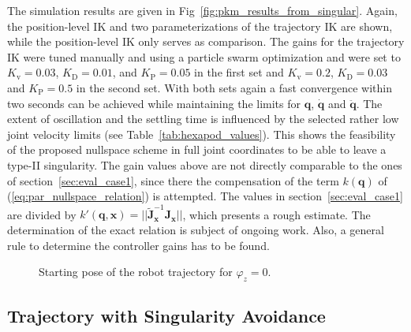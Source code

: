 \documentclass[a4paper,twoside]{article}
\begin{document}
The simulation results are given in Fig~\ref{fig:pkm_results_from_singular}.
Again, the position-level IK and two parameterizations of the trajectory IK are shown, while the position-level IK only serves as comparison.
The gains for the trajectory IK were tuned manually and using a particle swarm optimization and were set to $K_\mathrm{v}{=}0.03$, $K_\mathrm{D}{=}0.01$, and $K_\mathrm{P}{=}0.05$ in the first set and $K_\mathrm{v}{=}0.2$, $K_\mathrm{D}{=}0.03$ and $K_\mathrm{P}{=}0.5$ in the second set.
With both sets again a fast convergence within two seconds can be achieved while maintaining the limits for $\bm{q}$, $\dot{\bm{q}}$ and $\ddot{\bm{q}}$.
The extent of oscillation and the settling time is influenced by the selected rather low joint velocity limits (see Table~\ref{tab:hexapod_values}).
This shows the feasibility of the proposed nullspace scheme in full joint coordinates to be able to leave a type-II singularity.
%
The gain values above are not directly comparable to the ones of section~\ref{sec:eval_case1}, since there the compensation of the term $k(\bm{q})$ of (\ref{eq:par_nullspace_relation}) is attempted.
The values in section~\ref{sec:eval_case1} are divided by $k'(\bm{q},\bm{x})=||\tilde{\bm{J}}^{-1}_{\bm{x}} \bm{J}_{\bm{x}}||$, which presents a rough estimate.
The determination of the exact relation is subject of ongoing work.
Also, a general rule to determine the controller gains has to be found.


\begin{figure}[b]
	
	\caption{Starting pose of the robot trajectory for $\varphi_z{=}0$.}
	\label{fig:pkm_trajectory_startpose}
\end{figure}

\subsection{Trajectory with Singularity Avoidance}
\label{sec:casestudy_traj}
\end{document}
